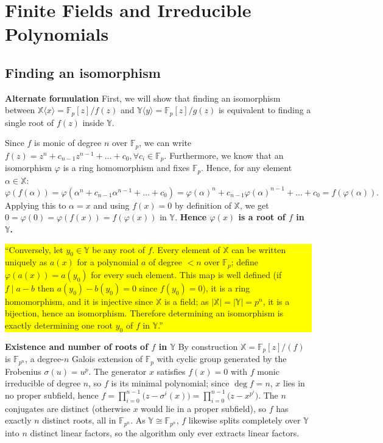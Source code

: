 \documentclass{article}
\newcommand{\aitext}[1]{%
  \colorbox{yellow}{\parbox{\dimexpr\linewidth-2\fboxsep\relax}{``#1''}}}
\begin{document}


\section{Finite Fields and Irreducible Polynomials}
\subsection{Finding an isomorphism}
\label{sec:findIsomorph}
\textbf{Alternate formulation}
\label{sec:altformulation}
First, we will show that finding an isomorphism between $\mathbb{X}\langle x \rangle = \mathbb{F}_p[z]/f(z)$ and $\mathbb{Y}\langle y \rangle = \mathbb{F}_p[z]/g(z)$ is equivalent to finding a single root of $f(z)$ inside $\mathbb{Y}$.

Since $f$ is monic of degree $n$ over $\mathbb{F}_p$, we can write $f(z) = z^n + c_{n-1}z^{n-1} + \dots + c_0, \forall c_i \in \mathbb{F}_p$. Furthermore, we know that an isomorphism $\varphi$ is a ring homomorphism and fixes $\mathbb{F}_p$. Hence, for any element $\alpha \in \mathbb{X}$:
\begin{equation}
    \varphi(f(\alpha)) = \varphi(\alpha^n + c_{n-1}\alpha^{n-1}+\dots+c_0)
    = \varphi(\alpha)^n + c_{n-1}\varphi(\alpha)^{n-1} + \dots + c_0 = f(\varphi(\alpha)).
\end{equation}
Applying this to $\alpha = x$ and using $f(x)=0$ by definition of $\mathbb{X}$, we get $0=\varphi(0)=\varphi(f(x))=f(\varphi(x))$ in $\mathbb{Y}$. \textbf{Hence $\varphi(x)$ is a root of $f$ in $\mathbb{Y}$.} 

\aitext{Conversely, let $y_0 \in \mathbb{Y}$ be any root of $f$. Every element of $\mathbb{X}$ can be written uniquely as $a(x)$ for a polynomial $a$ of degree $< n$ over $\mathbb{F}_p$; define $\varphi(a(x)) = a(y_0)$ for every such element. This map is well defined (if $f \mid a-b$ then $a(y_0)-b(y_0)=0$ since $f(y_0)=0$), it is a ring homomorphism, and it is injective since $\mathbb{X}$ is a field; as $|\mathbb{X}|=|\mathbb{Y}|=p^n$, it is a bijection, hence an isomorphism. Therefore determining an isomorphism is exactly determining one root $y_0$ of $f$ in $\mathbb{Y}$.}

\textbf{Existence and number of roots of $f$ in $\mathbb{Y}$}
\label{sec:rootcount}
By construction $\mathbb{X}=\mathbb{F}_p[z]/(f)$ is $\mathbb{F}_{p^n}$, a degree-$n$ Galois extension of $\mathbb{F}_p$ with cyclic group generated by the Frobenius $\sigma(u)=u^p$. The generator $x$ satisfies
$f(x)=0$ with $f$ monic irreducible of degree $n$, so $f$ is its minimal polynomial; since $\deg f=n$, $x$ lies in no proper subfield, hence $f = \prod_{i=0}^{n-1}\bigl(z-\sigma^i(x)\bigr) = \prod_{i=0}^{n-1}\bigl(z-x^{p^i}\bigr)$.
The $n$ conjugates are distinct (otherwise $x$ would lie in a proper subfield), so $f$ has exactly $n$ distinct roots, all in $\mathbb{F}_{p^n}$. As $\mathbb{Y}\cong\mathbb{F}_{p^n}$, $f$ likewise splits completely over $\mathbb{Y}$ into $n$ distinct linear factors, so the algorithm only ever extracts linear factors.
\end{document}
